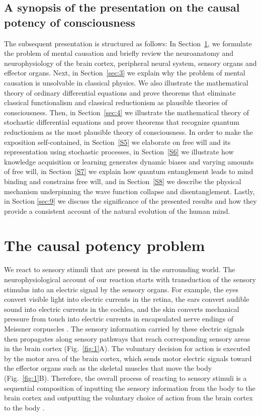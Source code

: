 \documentclass{ws-ijmpb}
\begin{document}
\subsection{A synopsis of the presentation on the causal potency of consciousness}

The subsequent presentation is structured as follows:
In Section~\ref{sec:2},
we formulate the problem of mental causation and briefly review the
neuroanatomy and neurophysiology of the brain cortex, peripheral neural
system, sensory organs and effector organs. Next,
in Section~\ref{sec:3}
we explain why the problem of mental causation is unsolvable in classical
physics. We also illustrate the mathematical theory of ordinary differential
equations and prove theorems that eliminate classical functionalism
and classical reductionism as plausible theories of consciousness.
Then,
in Section~\ref{sec:4} we illustrate the mathematical theory
of stochastic differential equations and prove theorems that recognize
quantum reductionism as the most plausible theory of consciousness.
In order to make the exposition self-contained,
in Section~\ref{S5} we elaborate on free will and its representation using stochastic processes,
in Section~\ref{S6} we illustrate how knowledge acquisition or learning generates dynamic biases and varying amounts of free will,
in Section~\ref{S7} we explain how quantum entanglement leads to mind binding and constrains free will,
and in Section~\ref{S8} we describe the physical mechanism underpinning the wave function collapse and disentanglement.
Lastly, in Section \ref{sec:9} we discuss the significance of the presented results and how they provide a consistent account of the natural evolution of the human mind.

\section{The causal potency problem}
\label{sec:2}

We react to sensory stimuli that are present in the surrounding world.
The neurophysiological account of our reaction starts with transduction
of the sensory stimulus into an electric signal by the sensory organs.
For example, the eyes convert visible light into electric currents
in the retina, the ears convert audible sound into electric currents
in the cochlea, and the skin converts mechanical pressure from touch
into electric currents in encapsulated nerve endings of Meissner corpuscles
\cite{Hall2021,Kandel2021}. The sensory information carried by these
electric signals then propagates along sensory pathways that reach
corresponding sensory areas in the brain cortex (Fig.~\ref{fig:1}A).
The voluntary decision for action is executed by the motor area of
the brain cortex, which sends motor electric signals toward the effector
organs such as the skeletal muscles that move the body (Fig.~\ref{fig:1}B).
Therefore, the overall process of reacting to sensory stimuli is a
sequential composition of inputting the sensory information from the
body to the brain cortex and outputting the voluntary choice of action
from the brain cortex to the body \cite{Georgiev2017}.
\end{document}
